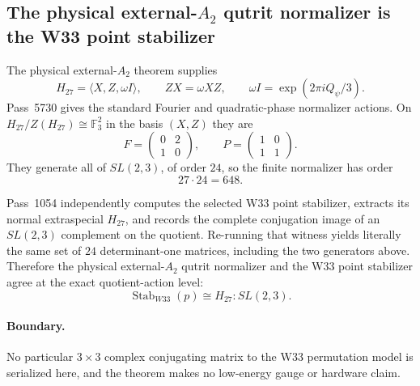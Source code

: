 \subsection*{The physical external-$A_2$ qutrit normalizer is the W33 point stabilizer}

The physical external-$A_2$ theorem supplies
\[
H_{27}=\langle X,Z,\omega I\rangle,
\qquad
ZX=\omega XZ,
\qquad
\omega I=\exp(2\pi iQ_\psi/3).
\]
Pass~5730 gives the standard Fourier and quadratic-phase normalizer actions.
On $H_{27}/Z(H_{27})\cong\mathbb F_3^2$ in the basis $(X,Z)$ they are
\[
F=\begin{pmatrix}0&2\\1&0\end{pmatrix},
\qquad
P=\begin{pmatrix}1&0\\1&1\end{pmatrix}.
\]
They generate all of $SL(2,3)$, of order $24$, so the finite normalizer has
order
\[
27\cdot24=648.
\]

Pass~1054 independently computes the selected W33 point stabilizer, extracts
its normal extraspecial $H_{27}$, and records the complete conjugation image of
an $SL(2,3)$ complement on the quotient.  Re-running that witness yields
literally the same set of $24$ determinant-one matrices, including the two
generators above.  Therefore the physical external-$A_2$ qutrit normalizer and
the W33 point stabilizer agree at the exact quotient-action level:
\[
\boxed{\operatorname{Stab}_{W33}(p)\cong H_{27}:SL(2,3).}
\]

\paragraph{Boundary.}
No particular $3\times3$ complex conjugating matrix to the W33 permutation
model is serialized here, and the theorem makes no low-energy gauge or
hardware claim.
